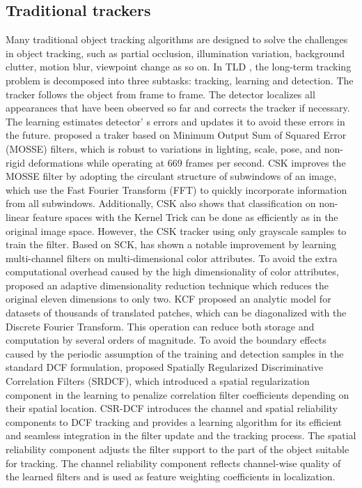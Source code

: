 \documentclass[review]{elsarticle}
\begin{document}
\subsection{Traditional trackers}
Many traditional object tracking algorithms are designed to solve the challenges in object tracking, such as partial occlusion, illumination variation, background clutter, motion blur, viewpoint change as so on.
In TLD \cite{kalal2011tracking}, the long-term tracking problem is decomposed into three subtasks: tracking, learning and detection. The tracker follows the object from frame to frame. The detector localizes all appearances that have been observed so far and corrects the tracker if necessary. The learning estimates detector’ s errors and updates it to avoid these errors in the future. 
\cite{Bolme2010VisualOT} proposed a traker based on Minimum Output Sum of Squared Error (MOSSE) filters, which is robust to variations in lighting, scale, pose, and non-rigid deformations while operating at 669 frames per second.
CSK \cite{Henriques2012ExploitingTC} improves the MOSSE filter by adopting the circulant structure of subwindows of an image, which use the Fast Fourier Transform (FFT) to quickly incorporate information from all subwindows. Additionally, CSK also shows that classification on non-linear feature spaces with the Kernel Trick can be done as efficiently as in the original image space. However, the CSK tracker using only grayscale samples to train the filter.
Based on SCK, \cite{Danelljan2014AdaptiveCA} has shown a notable improvement by learning multi-channel filters on multi-dimensional color attributes. To avoid the extra computational overhead caused by the high dimensionality of color attributes, \cite{Danelljan2014AdaptiveCA} proposed an adaptive dimensionality reduction technique which reduces the original eleven dimensions to only two.
KCF \cite{Henriques2015HighSpeedTW} proposed an analytic model for datasets of thousands of translated patches, which can be diagonalized with the Discrete Fourier Transform. This operation can reduce both storage and computation by several orders of magnitude.
To avoid the boundary effects caused by the periodic assumption of the training and detection samples in the standard DCF formulation, \cite{Danelljan2015LearningSR} proposed Spatially Regularized Discriminative Correlation Filters (SRDCF), which introduced a spatial regularization component in the learning to penalize correlation filter coefficients depending on their spatial location.
CSR-DCF \cite{Lukezic2017DiscriminativeCF} introduces the channel and spatial reliability components to DCF tracking and provides a learning algorithm for its efficient and seamless integration in the filter update and the tracking process. The spatial reliability component adjusts the filter support to the part of the object suitable for tracking. The channel reliability component reflects channel-wise quality of the learned filters and is used as feature weighting coefficients in localization.
\end{document}
